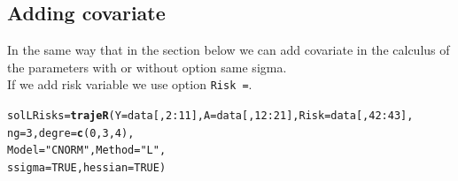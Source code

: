 \documentclass{article}\usepackage[]{graphicx}\usepackage[]{color}
\makeatletter
\newcommand{\hlnum}[1]{\textcolor[rgb]{0.686,0.059,0.569}{#1}}%
\newcommand{\hlstr}[1]{\textcolor[rgb]{0.192,0.494,0.8}{#1}}%
\newcommand{\hlopt}[1]{\textcolor[rgb]{0,0,0}{#1}}%
\newcommand{\hlstd}[1]{\textcolor[rgb]{0.345,0.345,0.345}{#1}}%
\newcommand{\hlkwb}[1]{\textcolor[rgb]{0.69,0.353,0.396}{#1}}%
\newcommand{\hlkwc}[1]{\textcolor[rgb]{0.333,0.667,0.333}{#1}}%
\newcommand{\hlkwd}[1]{\textcolor[rgb]{0.737,0.353,0.396}{\textbf{#1}}}%
\newenvironment{kframe}{%
 \def\at@end@of@kframe{}%
 \ifinner\ifhmode%
  \def\at@end@of@kframe{\end{minipage}}%
  \begin{minipage}{\columnwidth}%
 \fi\fi%
 \def\FrameCommand##1{\hskip\@totalleftmargin \hskip-\fboxsep
 \colorbox{shadecolor}{##1}\hskip-\fboxsep
     \hskip-\linewidth \hskip-\@totalleftmargin \hskip\columnwidth}%
 \MakeFramed {\advance\hsize-\width
   \@totalleftmargin\z@ \linewidth\hsize
   \@setminipage}}%
 {\par\unskip\endMakeFramed%
 \at@end@of@kframe}
\newenvironment{knitrout}{}{} %
\makeatother
\begin{document}
\subsection{Adding covariate}
In the same way that in the section below we can add covariate in the calculus of the parameters with or without option same sigma. \\

If we add risk variable we use option \verb|Risk =|.
\begin{knitrout}
\color{fgcolor}\begin{kframe}
\begin{alltt}
\hlstd{solLRisks} \hlkwb{=} \hlkwd{trajeR}\hlstd{(}\hlkwc{Y} \hlstd{= data[,}\hlnum{2}\hlopt{:}\hlnum{11}\hlstd{],} \hlkwc{A} \hlstd{= data[,}\hlnum{12}\hlopt{:}\hlnum{21}\hlstd{],} \hlkwc{Risk} \hlstd{= data[,}\hlnum{42}\hlopt{:}\hlnum{43}\hlstd{],}
                   \hlkwc{ng} \hlstd{=} \hlnum{3}\hlstd{,} \hlkwc{degre} \hlstd{=} \hlkwd{c}\hlstd{(}\hlnum{0}\hlstd{,}\hlnum{3}\hlstd{,}\hlnum{4}\hlstd{),}
                   \hlkwc{Model} \hlstd{=} \hlstr{"CNORM"}\hlstd{,} \hlkwc{Method} \hlstd{=} \hlstr{"L"}\hlstd{,}
                   \hlkwc{ssigma} \hlstd{=} \hlnum{TRUE}\hlstd{,} \hlkwc{hessian} \hlstd{=} \hlnum{TRUE}\hlstd{)}
\end{alltt}
\end{kframe}
\end{knitrout}
\end{document}
